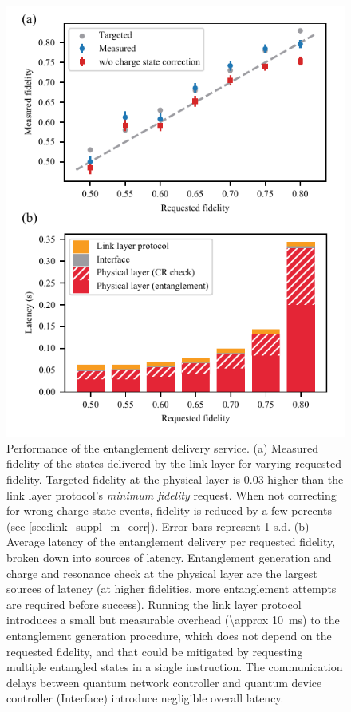 \begin{figure}
    \centering
    \includegraphics[width=0.6\linewidth]{figures/latencyvsfid.pdf}
    \caption{
        Performance of the entanglement delivery service.
        (a) Measured fidelity of the states delivered by the link layer for varying requested
        fidelity. Targeted fidelity at the physical layer is 0.03 higher than the link layer
        protocol's \emph{minimum fidelity} request. When not correcting for wrong charge state
        events, fidelity is reduced by a few percents (see \cref{sec:link_suppl_m_corr}).
        Error bars represent \num{1} s.d.
        (b) Average latency of the entanglement delivery per requested fidelity, broken down into
        sources of latency. Entanglement generation and charge and resonance check at the
        physical layer are the largest sources of latency (at higher fidelities, more
        entanglement attempts are required before success). Running the link layer protocol
        introduces a small but measurable overhead (\qty{\approx 10}{ms}) to the entanglement
        generation procedure, which does not depend on the requested fidelity, and that could
        be mitigated by requesting multiple entangled states in a single instruction. The
        communication delays between quantum network controller and quantum device controller
        (Interface) introduce negligible overall latency.
    }
    \label{fig:latencyvsfid}
\end{figure}

